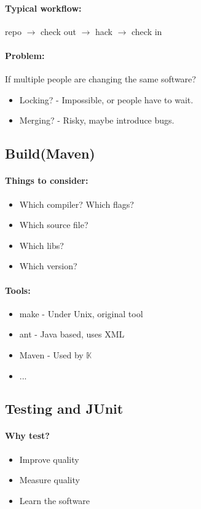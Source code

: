 \documentclass[12pt]{article}
\begin{document}
    \paragraph{Typical workflow: } repo $\rightarrow$ check out $\rightarrow$ hack $\rightarrow$ check in
    \paragraph{Problem:} If multiple people are changing the same software?
    \begin{itemize}
        \item Locking? - Impossible, or people have to wait.
        \item Merging? - Risky, maybe introduce bugs.
    \end{itemize}

\subsection{Build(Maven)}
    \paragraph{Things to consider:}
    \begin{itemize}
        \item Which compiler? Which flags?
        \item Which source file?
        \item Which libs?
        \item Which version?
    \end{itemize}
    
    \paragraph{Tools:}
    \begin{itemize}
        \item make - Under Unix, original tool
        \item ant - Java based, uses XML
        \item Maven - Used by $\mathbb{K}$
        \item ...
    \end{itemize}

    \subsection{Testing and JUnit}
    
    \paragraph{Why test?}
    \begin{itemize}
        \item Improve quality
        \item Measure quality
        \item Learn the software
    \end{itemize}
    
\end{document}
